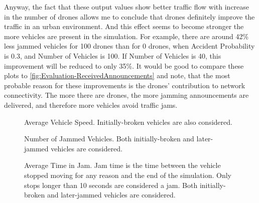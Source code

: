 \documentclass[]{nsm-thesis}
\begin{document}
Anyway, the fact that these output values show better traffic flow with increase in the number of drones allows me to conclude that drones definitely improve the traffic in an urban environment. And this effect seems to become stronger the more vehicles are present in the simulation. For example, there are around 42\% less jammed vehicles for 100 drones than for 0 drones, when Accident Probability is 0.3, and Number of Vehicles is 100. If Number of Vehicles is 40, this improvement will be reduced to only 35\%. It would be good to compare these plots to \cref{fig:Evaluation-ReceivedAnnouncements} and note, that the most probable reason for these improvements is the drones' contribution to network connectivity. The more there are drones, the more jamming announcements are delivered, and therefore more vehicles avoid traffic jams.

\begin{figure}%
	\centering
	\hfill
	\hfill
	\caption{Average Vehicle Speed. Initially-broken vehicles are also considered.}%
	\label{fig:Evaluation-VehicleSpeed}%
\end{figure}

\begin{figure}%
	\centering
	\hfill
	\hfill
	\caption{Number of Jammed Vehicles. Both initially-broken and later-jammed vehicles are considered.}%
	\label{fig:Evaluation-JammedNumber}%
\end{figure}

\begin{figure}%
	\centering
	\hfill
	\hfill
	\caption{Average Time in Jam. Jam time is the time between the vehicle stopped moving for any reason and the end of the simulation. Only stops longer than 10 seconds are considered a jam. Both initially-broken and later-jammed vehicles are considered.}%
	\label{fig:Evaluation-JamTime}%
\end{figure}
\end{document}
